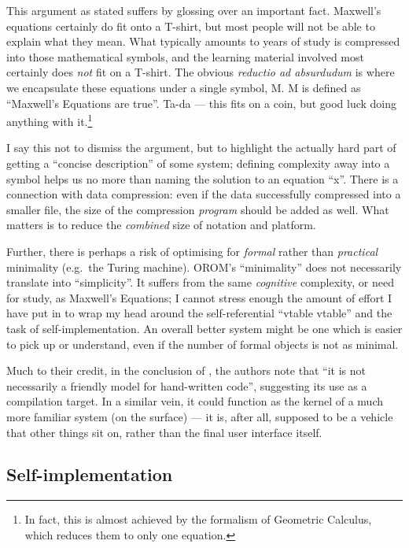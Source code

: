 This argument as stated suffers by glossing over an important fact.
Maxwell's equations certainly do fit onto a T-shirt, but most people
will not be able to explain what they mean. What typically amounts to
years of study is compressed into those mathematical symbols, and the
learning material involved most certainly does \emph{not} fit on a
T-shirt. The obvious \emph{reductio ad absurdudum} is where we
encapsulate these equations under a single symbol, M. M is defined as
``Maxwell's Equations are true''. Ta-da --- this fits on a coin, but
good luck doing anything with it.\footnote{In fact, this is almost
  achieved by the formalism of Geometric Calculus, which reduces them to
  only one equation.}

I say this not to dismiss the argument, but to highlight the actually
hard part of getting a ``concise description'' of some system; defining
complexity away into a symbol helps us no more than naming the solution
to an equation ``x''. There is a connection with data compression: even
if the data successfully compressed into a smaller file, the size of the
compression \emph{program} should be added as well. What matters is to
reduce the \emph{combined} size of notation and platform.

Further, there is perhaps a risk of optimising for \emph{formal} rather
than \emph{practical} minimality (e.g.~the Turing machine). OROM's
``minimality'' does not necessarily translate into ``simplicity''. It
suffers from the same \emph{cognitive} complexity, or need for study, as
Maxwell's Equations; I cannot stress enough the amount of effort I have
put in to wrap my head around the self-referential ``vtable vtable'' and
the task of self-implementation. An overall better system might be one
which is easier to pick up or understand, even if the number of formal
objects is not as minimal.

Much to their credit, in the conclusion of \cite{OROM}, the authors note
that ``it is not necessarily a friendly model for hand-written code'',
suggesting its use as a compilation target. In a similar vein, it could
function as the kernel of a much more familiar system (on the surface)
--- it is, after all, supposed to be a vehicle that other things sit on,
rather than the final user interface itself.

\hypertarget{self-implementation}{%
\subsection{Self-implementation}\label{self-implementation}}

